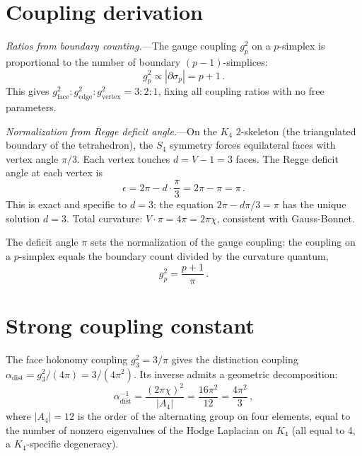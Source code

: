 \documentclass[aps,prl,twocolumn,superscriptaddress,showpacs]{revtex4-2}
\begin{document}

\section{Coupling derivation}

\textit{Ratios from boundary counting.}---The gauge coupling
$g_p^2$ on a $p$-simplex is proportional to the number of
boundary $(p-1)$-simplices:
\begin{equation}
g_p^2 \propto |\partial \sigma_p| = p + 1 \,.
\label{eq:ratios}
\end{equation}
This gives $g_{\mathrm{face}}^2 : g_{\mathrm{edge}}^2 :
g_{\mathrm{vertex}}^2 = 3 : 2 : 1$, fixing all coupling ratios
with no free parameters.

\textit{Normalization from Regge deficit angle.}---On the $K_4$
2-skeleton (the triangulated boundary of the tetrahedron), the
$S_4$ symmetry forces equilateral faces with vertex angle $\pi/3$.
Each vertex touches $d = V - 1 = 3$ faces. The Regge deficit
angle at each vertex is
\begin{equation}
\epsilon = 2\pi - d \cdot \frac{\pi}{3} = 2\pi - \pi = \pi \,.
\label{eq:deficit}
\end{equation}
This is exact and specific to $d = 3$: the equation
$2\pi - d\pi/3 = \pi$ has the unique solution $d = 3$.
Total curvature: $V \cdot \pi = 4\pi = 2\pi\chi$, consistent
with Gauss-Bonnet.

The deficit angle $\pi$ sets the normalization of the gauge
coupling: the coupling on a $p$-simplex equals the boundary
count divided by the curvature quantum,
\begin{equation}
\boxed{g_p^2 = \frac{p+1}{\pi}} \,.
\label{eq:coupling}
\end{equation}


\section{Strong coupling constant}

The face holonomy coupling $g_3^2 = 3/\pi$ gives the distinction
coupling $\alpha_{\mathrm{dist}} = g_3^2/(4\pi) = 3/(4\pi^2)$.
Its inverse admits a geometric decomposition:
\begin{equation}
\alpha_{\mathrm{dist}}^{-1} = \frac{(2\pi\chi)^2}{|A_4|}
= \frac{16\pi^2}{12} = \frac{4\pi^2}{3} \,,
\label{eq:alpha_dist}
\end{equation}
where $|A_4| = 12$ is the order of the alternating group on four
elements, equal to the number of nonzero eigenvalues of the Hodge
Laplacian on $K_4$ (all equal to 4, a $K_4$-specific degeneracy).
\end{document}
